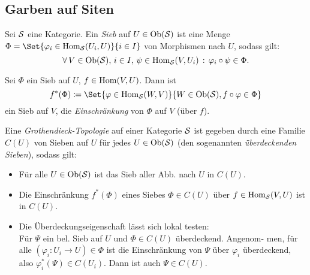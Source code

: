 \documentclass{cheat-sheet}
\begin{document}



\begin{samepage}

\subsection{Garben auf Siten}

\end{samepage}

\begin{defn}
  Sei $\mathcal{S}$ eine Kategorie. Ein \emph{Sieb} auf $U \in \operatorname{Ob}(\mathcal{S})$ ist eine Menge $\Phi = \Set{\varphi_i \in \Hom_\Sit(U_i, U)}{i \in I}$ von Morphismen nach $U$, sodass gilt:
  \[ \forall \, {V \in \operatorname{Ob}(\mathcal{S}), \, i \in I, \, \psi \in \operatorname{Hom}_{\mathcal{S}}(V, U_i)} \,:\, \varphi_i \circ \psi \in \Phi. \]
\end{defn}

\begin{bem}
  Sei $\Phi$ ein Sieb auf $U$, $f \in \operatorname{Hom}(V, U)$. Dann ist
  \[ f^*(\Phi) \coloneqq \Set{\varphi \in \Hom_\Sit(W, V)}{W \in \Ob(\Sit), f \circ \varphi \in \Phi} \]
  ein Sieb auf $V$, die \emph{Einschränkung} von $\Phi$ auf $V$ (über $f$).
\end{bem}

\begin{defn}
  Eine \emph{Grothendieck-Topologie} auf einer Kategorie $\mathcal{S}$ ist gegeben durch eine Familie $C(U)$ von Sieben auf $U$ für jedes $U \in \operatorname{Ob}(\mathcal{S})$ (den sogenannten \emph{überdeckenden Sieben}), sodass gilt:
  \begin{itemize}
    \item Für alle $U \in \operatorname{Ob}(\mathcal{S})$ ist das Sieb aller Abb. nach $U$ in $C(U)$.
    \item Die Einschränkung $f^*(\Phi)$ eines Siebes $\Phi \in C(U)$ über $f \in \operatorname{Hom}_{\mathcal{S}}(V, U)$ ist in $C(U)$.
    \item Die Überdeckungseigenschaft lässt sich lokal testen: \\
    Für $\Psi$ ein bel. Sieb auf $U$ und $\Phi \in C(U)$ überdeckend. Angenom- men, für alle $(\varphi_i : U_i \to U) \in \Phi$ ist die Einschränkung von $\Psi$ über $\varphi_i$ überdeckend, also $\varphi_i^*(\Psi) \in C(U_i)$. Dann ist auch $\Psi \in C(U)$.
  \end{itemize}
\end{defn}
\end{document}
